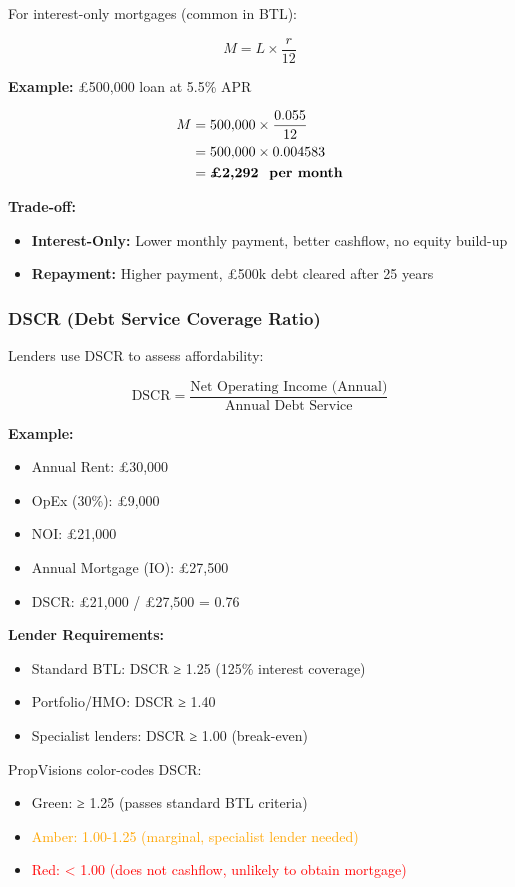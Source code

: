 \documentclass[11pt,a4paper]{article}
\begin{document}
For interest-only mortgages (common in BTL):

\[
M = L \times \frac{r}{12}
\]

\textbf{Example:} £500,000 loan at 5.5\% APR

\begin{align*}
M &= 500{,}000 \times \frac{0.055}{12} \\
  &= 500{,}000 \times 0.004583 \\
  &= \textbf{£2,292 \text{ per month}}
\end{align*}

\textbf{Trade-off:}
\begin{itemize}
  \item \textbf{Interest-Only:} Lower monthly payment, better cashflow, no equity build-up
  \item \textbf{Repayment:} Higher payment, £500k debt cleared after 25 years
\end{itemize}

\subsubsection{DSCR (Debt Service Coverage Ratio)}

Lenders use DSCR to assess affordability:

\[
\text{DSCR} = \frac{\text{Net Operating Income (Annual)}}{\text{Annual Debt Service}}
\]

\textbf{Example:}
\begin{itemize}
  \item Annual Rent: £30,000
  \item OpEx (30\%): £9,000
  \item NOI: £21,000
  \item Annual Mortgage (IO): £27,500
  \item DSCR: £21,000 / £27,500 = 0.76
\end{itemize}

\textbf{Lender Requirements:}
\begin{itemize}
  \item Standard BTL: DSCR ≥ 1.25 (125\% interest coverage)
  \item Portfolio/HMO: DSCR ≥ 1.40
  \item Specialist lenders: DSCR ≥ 1.00 (break-even)
\end{itemize}

PropVisions color-codes DSCR:
\begin{itemize}
  \item \textcolor{green!70!black}{Green: ≥ 1.25 (passes standard BTL criteria)}
  \item \textcolor{orange}{Amber: 1.00-1.25 (marginal, specialist lender needed)}
  \item \textcolor{red}{Red: < 1.00 (does not cashflow, unlikely to obtain mortgage)}
\end{itemize}
\end{document}
